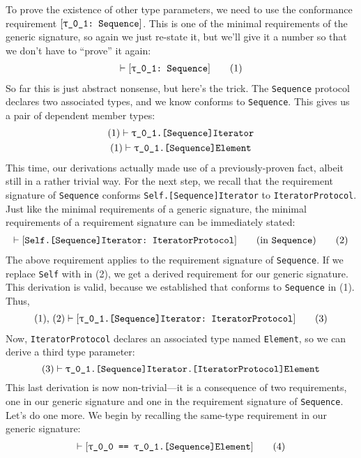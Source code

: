 \documentclass[../generics]{subfiles}
\begin{document}
To prove the existence of other type parameters, we need to use the conformance requirement $[\texttt{\texttt{$\uptau$\_0\_1}:~Sequence}]$. This is one of the minimal requirements of the generic signature, so again we just re-state it, but we'll give it a number so that we don't have to ``prove'' it again:
\begin{gather}
\vdash[\texttt{\texttt{$\uptau$\_0\_1}:~Sequence}]\tag{1}
\end{gather}
So far this is just abstract nonsense, but here's the trick. The \texttt{Sequence} protocol declares two associated types, and we know  conforms to \texttt{Sequence}. This gives us a pair of dependent member types:
\begin{gather*}
(1)\vdash\texttt{\texttt{$\uptau$\_0\_1}.[Sequence]Iterator}\\
(1)\vdash\texttt{\texttt{$\uptau$\_0\_1}.[Sequence]Element}
\end{gather*}
This time, our derivations actually made use of a previously-proven fact, albeit still in a rather trivial way. For the next step, we recall that the requirement signature of \texttt{Sequence} conforms \texttt{Self.[Sequence]Iterator} to \texttt{IteratorProtocol}. Just like the minimal requirements of a generic signature, the minimal requirements of a requirement signature can be immediately stated:
\begin{gather}
\vdash[\texttt{Self.[Sequence]Iterator:~IteratorProtocol}]\qquad\mbox{(in \texttt{Sequence})}\tag{2}
\end{gather}
The above requirement applies to the requirement signature of \texttt{Sequence}. If we replace \texttt{Self} with  in (2), we get a derived requirement for our generic signature. This derivation is valid, because we established that  conforms to \texttt{Sequence} in (1). Thus,
\begin{gather}
(1),\,(2)\vdash[\texttt{\texttt{$\uptau$\_0\_1}.[Sequence]Iterator:~IteratorProtocol}]\tag{3}
\end{gather}
Now, \texttt{IteratorProtocol} declares an associated type named \texttt{Element}, so we can derive a third type parameter:
\[(3)\vdash\texttt{\texttt{$\uptau$\_0\_1}.[Sequence]Iterator.[IteratorProtocol]Element}\]
This last derivation is now non-trivial---it is a consequence of two requirements, one in our generic signature and one in the requirement signature of \texttt{Sequence}. Let's do one more. We begin by recalling the same-type requirement in our generic signature:
\begin{gather}
\vdash[\texttt{\texttt{$\uptau$\_0\_0} == \texttt{$\uptau$\_0\_1}.[Sequence]Element}]\tag{4}
\end{gather}
\end{document}
